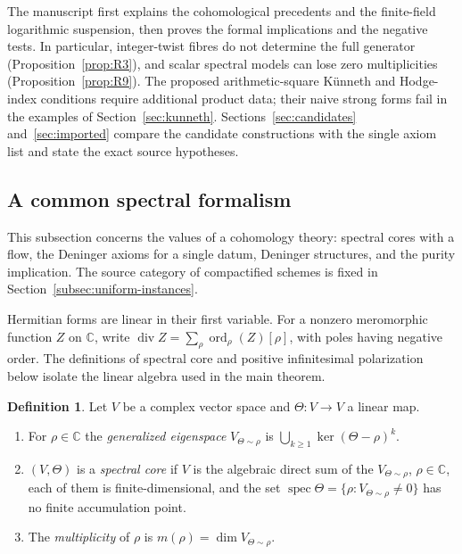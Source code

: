 \documentclass[11pt]{amsart}
\theoremstyle{plain}
\theoremstyle{definition}
\newtheorem{definition}[theorem]{Definition}
\theoremstyle{remark}
\numberwithin{equation}{section}
\newcommand{\C}{\mathbb{C}}
\DeclareMathOperator{\spec}{spec}
\DeclareMathOperator{\divisor}{div}
\DeclareMathOperator{\ord}{ord}
\begin{document}
The manuscript first explains the cohomological precedents and the
finite-field logarithmic suspension, then proves the formal
implications and the negative tests.  In particular, integer-twist
fibres do not determine the full generator
(Proposition~\ref{prop:R3}), and scalar spectral models can lose
zero multiplicities (Proposition~\ref{prop:R9}).  The proposed
arithmetic-square K\"unneth and Hodge-index conditions require
additional product data; their naive strong forms fail in the
examples of Section~\ref{sec:kunneth}.  Sections~\ref{sec:candidates}
and~\ref{sec:imported} compare the candidate constructions with the
single axiom list and state the exact source hypotheses.






\subsection{A common spectral formalism}
\label{subsec:uniform-formalism}

This subsection concerns the values of a cohomology theory: spectral
cores with a flow, the Deninger axioms for a single datum, Deninger
structures, and the purity implication. The source category of
compactified schemes is fixed in Section~\ref{subsec:uniform-instances}.


Hermitian forms are linear in their first variable. For a nonzero
meromorphic function $Z$ on $\C$, write
$\divisor Z=\sum_\rho\ord_\rho(Z)[\rho]$, with poles having negative
order. The definitions of spectral core and positive infinitesimal
polarization below isolate the linear algebra used in the main theorem.

\begin{definition}\label{def:spectral-core}
Let $V$ be a complex vector space and $\Theta:V\to V$ a linear map.
\begin{enumerate}[label=(\alph*)]
\item For $\rho\in\C$ the \emph{generalized eigenspace}
  $V_{\Theta\sim\rho}$ is $\bigcup_{k\ge1}\ker(\Theta-\rho)^k$.
\item $(V,\Theta)$ is a \emph{spectral core} if $V$ is the algebraic
  direct sum of the $V_{\Theta\sim\rho}$, $\rho\in\C$, each of them is
  finite-dimensional, and the set
  $\spec\Theta=\{\rho:V_{\Theta\sim\rho}\ne0\}$ has no finite
  accumulation point.
\item The \emph{multiplicity} of $\rho$ is
  $m(\rho)=\dim V_{\Theta\sim\rho}$.
\end{enumerate}
\end{definition}
\end{document}
